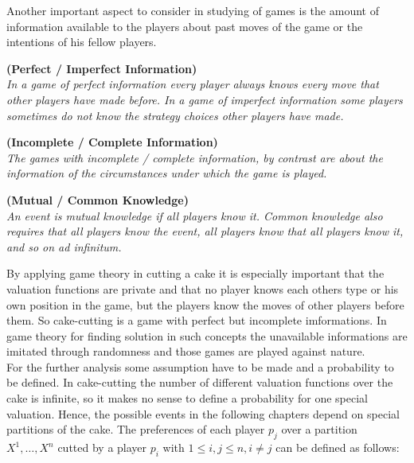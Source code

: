 \newline
Another important aspect to consider in studying of games is the amount of information available to the players about past moves of the game or the intentions of his fellow players. 
\begin{defi}{\textbf{(Perfect / Imperfect Information)}}\\
\emph{In a game of \emph{perfect information} every player always knows every move that other players have made before. In a game of \emph{imperfect information} some players sometimes do not know the strategy choices other players have made.}
\end{defi}
\begin{defi}{\textbf{(Incomplete / Complete Information)}}\\
\emph{The games with \emph{incomplete / complete information}, by contrast are about the information of the circumstances under which the game is played.}
\end{defi}
\begin{defi}{\textbf{(Mutual / Common Knowledge)}}\\
\emph{An event is \emph{mutual knowledge} if all players know it. \emph{Common knowledge} also requires that all players know the event, all players know that all players know it, and so on ad infinitum.}
\end{defi}
By applying game theory in cutting a cake it is especially important that the valuation functions are private and that no player knows each others type or his own position in the game, but the players know the moves of other players before them. So cake-cutting is a game with perfect but incomplete imformations. In game theory for finding solution in such concepts the unavailable informations are imitated through randomness and those games are played against nature.\\For the further analysis some assumption have to be made and a probability to be defined. In cake-cutting the number of different valuation functions over the cake is infinite, so it makes no sense to define a probability for one special valuation. Hence, the possible events in the following chapters depend on special partitions of the cake. The preferences of each player $p_j$ over a partition $X^1, \ldots, X^n$ cutted by a player $p_i$ with $1 \leq i,j \leq n, i \neq j$ can be defined as follows:    
